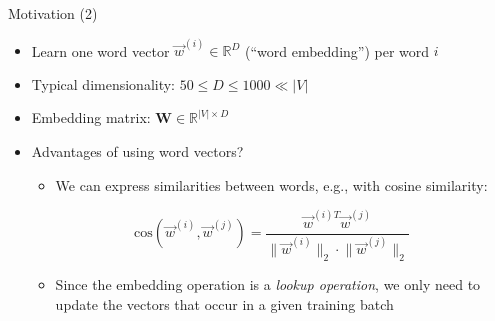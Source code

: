 \documentclass[11pt,compress,t,notes=noshow, xcolor=table]{beamer}
\begin{document}

\begin{frame}{Motivation (2)}

\vfill

\begin{itemize}
	\item Learn one word vector $\vec w^{(i)} \in \mathbb{R}^{D}$ (``word embedding'') per word $i$
	\item Typical dimensionality: $50 \leq D \leq 1000 \ll |V|$
	\item Embedding matrix: $\mathbf{W} \in \mathbb{R}^{|V|\times D}$
	\item \ques Advantages of using word vectors?
	\pause
		\begin{itemize}
			\item We can express similarities between words, e.g., with cosine similarity:
		\end{itemize}
		 $$\mathrm{cos}(\vec w^{(i)}, \vec w^{(j)}) = \frac{\vec w^{(i)T}\vec w^{(j)}}{\lVert \vec w^{(i)} \rVert_2 \cdot \lVert \vec w^{(j)}\lVert_2}$$
		\begin{itemize}
			\item Since the embedding operation is a \emph{lookup operation}, we only need to update the vectors that occur in a given training batch
		\end{itemize}
\end{itemize}

\vfill

\end{frame}

\end{document}
